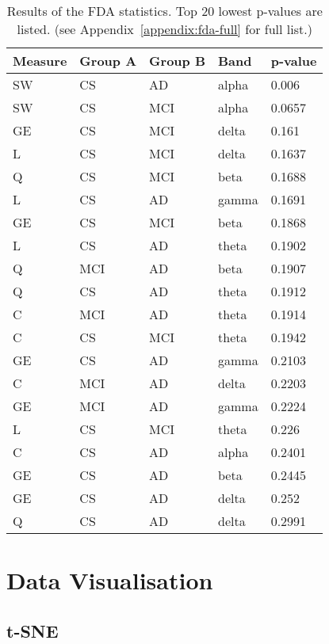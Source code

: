 			\begin{table}
				\centering
				\begin{tabular}{|l|l|l|l|l|} \hline
					\textbf{Measure} & \textbf{Group A} & \textbf{Group B} & \textbf{Band} & \textbf{p-value} \\ \hline
					SW & CS  & AD  & alpha & 0.006  \\ 
					SW & CS  & MCI & alpha & 0.0657 \\
					GE & CS  & MCI & delta & 0.161  \\
					L  & CS  & MCI & delta & 0.1637 \\
					Q  & CS  & MCI & beta  & 0.1688 \\
					L  & CS  & AD  & gamma & 0.1691 \\
					GE & CS  & MCI & beta  & 0.1868 \\
					L  & CS  & AD  & theta & 0.1902 \\
					Q  & MCI & AD  & beta  & 0.1907 \\
					Q  & CS  & AD  & theta & 0.1912 \\
					C  & MCI & AD  & theta & 0.1914 \\
					C  & CS  & MCI & theta & 0.1942 \\
					GE & CS  & AD  & gamma & 0.2103 \\
					C  & MCI & AD  & delta & 0.2203 \\
					GE & MCI & AD  & gamma & 0.2224 \\
					L  & CS  & MCI & theta & 0.226  \\
					C  & CS  & AD  & alpha & 0.2401 \\
					GE & CS  & AD  & beta  & 0.2445 \\
					GE & CS  & AD  & delta & 0.252  \\
					Q  & CS  & AD  & delta & 0.2991 \\
				\hline
		    	\end{tabular}
			   	\caption{Results of the FDA statistics. Top 20 lowest p-values are listed. (see Appendix~\ref{appendix:fda-full} for full list.)}
			    \label{tab:fda-top}
			\end{table}

	\section{Data Visualisation}
		\subsection{t-SNE}
		
